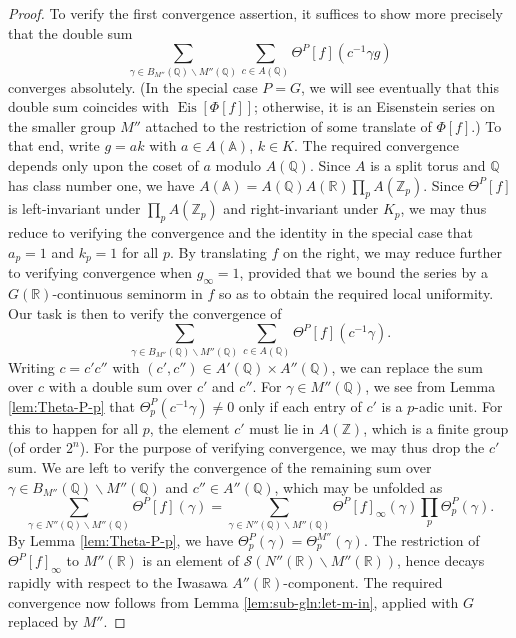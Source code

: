 \documentclass[reqno]{amsart}
\DeclareMathOperator{\Eis}{Eis}
\theoremstyle{plain} \newtheorem{theorem} {Theorem}
\theoremstyle{definition} \newtheorem{definition} [theorem] {Definition}
\theoremstyle{itplain} %
\numberwithin{equation}{section}
\numberwithin{theorem}{section}
\begin{document}
\begin{proof}
  To verify  the first convergence assertion, it suffices to show more precisely that the double sum
  \begin{equation}\label{eq:sum-_gamma-in-1}
    \sum _{\gamma \in {B}_{M''}(\mathbb{Q}) \backslash M''(\mathbb{Q})}
    \sum _{c \in A(\mathbb{Q})} \Theta^P[f](c^{-1} \gamma g)
  \end{equation}
  converges absolutely.  (In the special case $P = G$, we will see eventually that this double sum coincides with $\Eis[\Phi[f]]$; otherwise, it is an Eisenstein series on the smaller group $M''$ attached to the restriction of some translate of $\Phi[f]$.)  To that end, write $g = a k$ with $a \in A(\mathbb{A})$, $k \in K$.  The required convergence depends only upon the coset of $a$ modulo $A(\mathbb{Q})$.  Since $A$ is a split torus and $\mathbb{Q}$ has class number one, we have $A(\mathbb{A}) = A(\mathbb{Q}) A(\mathbb{R}) \prod_p A(\mathbb{Z}_p)$.  Since $\Theta^P[f]$ is left-invariant under $\prod_p A(\mathbb{Z}_p)$ and right-invariant under $K_p$, we may thus reduce to verifying the convergence and the identity in the special case that $a_p = 1$ and $k_p = 1$ for all $p$.  By translating $f $ on the right, we may reduce further to verifying convergence when $g_\infty = 1$, provided that we bound the series by a $G(\mathbb{R})$-continuous seminorm in $f$ so as to obtain the required local uniformity.  Our task is then to verify the convergence of
  \begin{equation*}
    \sum _{\gamma \in {B}_{M''}(\mathbb{Q}) \backslash M''(\mathbb{Q})}
    \sum _{c \in A(\mathbb{Q})}
    \Theta^P[f](c^{-1} \gamma).
  \end{equation*}
  Writing $c = c' c''$ with $(c',c'') \in A'(\mathbb{Q}) \times A''(\mathbb{Q})$, we can replace the sum over $c$ with a double sum over $c'$ and $c''$.  For $\gamma \in M''(\mathbb{Q})$, we see from Lemma \ref{lem:Theta-P-p} that $\Theta^P_p(c^{-1} \gamma) \neq 0$ only if each entry of $c'$ is a $p$-adic unit.  For this to happen for all $p$, the element $c'$ must lie in $A(\mathbb{Z})$, which is a finite group (of order $2^n$).  For the purpose of verifying convergence, we may thus drop the $c'$ sum.  We are left to verify the convergence of the remaining sum over $\gamma \in {B}_{M''}(\mathbb{Q}) \backslash M''(\mathbb{Q})$ and $c'' \in A''(\mathbb{Q})$, which may be unfolded as
  \begin{equation*}
    \sum _{\gamma \in N''(\mathbb{Q}) \backslash M''(\mathbb{Q})}
    \Theta^P[f](\gamma)
    =
    \sum _{\gamma \in N''(\mathbb{Q}) \backslash M''(\mathbb{Q})}
    \Theta^P[f]_\infty (\gamma)
    \prod _p 
    \Theta^P_p(\gamma).
  \end{equation*}
  By  Lemma \ref{lem:Theta-P-p}, we have $\Theta_p^P(\gamma) = \Theta_p^{M''}(\gamma)$.  The restriction of  $\Theta^P[f]_\infty$ to $M''(\mathbb{R})$ is an element of $\mathcal{S}(N''(\mathbb{R}) \backslash M''(\mathbb{R}))$, hence decays rapidly with respect to the Iwasawa $A''(\mathbb{R})$-component.  The required convergence now follows from Lemma \ref{lem:sub-gln:let-m-in}, applied with $G$ replaced by $M''$.


\end{proof}
\end{document}
